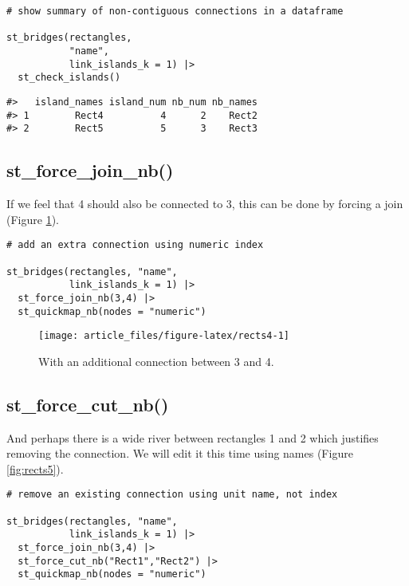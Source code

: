 \begin{verbatim}
# show summary of non-contiguous connections in a dataframe

st_bridges(rectangles,
           "name",
           link_islands_k = 1) |>
  st_check_islands()
\end{verbatim}

\begin{verbatim}
#>   island_names island_num nb_num nb_names
#> 1        Rect4          4      2    Rect2
#> 2        Rect5          5      3    Rect3
\end{verbatim}

\subsection{st\_force\_join\_nb()}\label{st_force_join_nb}

If we feel that 4 should also be connected to 3, this can be done
by forcing a join (Figure \ref{fig:rects4}).

\begin{verbatim}
# add an extra connection using numeric index

st_bridges(rectangles, "name",
           link_islands_k = 1) |>
  st_force_join_nb(3,4) |>
  st_quickmap_nb(nodes = "numeric")
\end{verbatim}

\begin{figure}

{\centering \texttt{[image: article\_files/figure-latex/rects4-1]} 

}

\caption{With an additional connection between 3 and 4. }\label{fig:rects4}
\end{figure}

\subsection{st\_force\_cut\_nb()}\label{st_force_cut_nb}

And perhaps there is a wide river between rectangles 1 and 2 which
justifies removing the connection. We will edit it this time using
names (Figure \ref{fig:rects5}).

\begin{verbatim}
# remove an existing connection using unit name, not index

st_bridges(rectangles, "name",
           link_islands_k = 1) |>
  st_force_join_nb(3,4) |>
  st_force_cut_nb("Rect1","Rect2") |>
  st_quickmap_nb(nodes = "numeric")
\end{verbatim}

